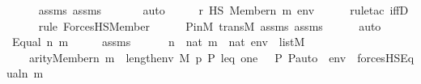 \begin{isabellebody}
\ \ \ \ \isamarkupfalse%
\ assms\ assms{}\ \isanewline
\ \ \ \ \isamarkupfalse%
\ auto\isanewline
\ \ \isamarkupfalse%
\ \isamarkupfalse%
\ {\isachardoublequoteopen}r\ {\isasymtturnstile}HS\ {\isacharparenleft}{\kern0pt}Member{\isacharparenleft}{\kern0pt}n{\isacharcomma}{\kern0pt}\ m{\isacharparenright}{\kern0pt}{\isacharparenright}{\kern0pt}\ env{\isachardoublequoteclose}\ \isanewline
\ \ \ \ \isamarkupfalse%
{\isacharparenleft}{\kern0pt}rule{\isacharunderscore}{\kern0pt}tac\ iffD{}{\isacharparenright}{\kern0pt}\isanewline
\ \ \ \ \ \isamarkupfalse%
{\isacharparenleft}{\kern0pt}rule\ ForcesHS{\isacharunderscore}{\kern0pt}Member{\isacharparenright}{\kern0pt}\isanewline
\ \ \ \ \isamarkupfalse%
\ P{\isacharunderscore}{\kern0pt}in{\isacharunderscore}{\kern0pt}M\ transM\ assms\ assms{}\isanewline
\ \ \ \ \isamarkupfalse%
\ auto\isanewline
{}\isamarkupfalse%
\isanewline
\ \ \isamarkupfalse%
\ {\isacharparenleft}{\kern0pt}Equal\ n\ m{\isacharparenright}{\kern0pt}\isanewline
\ \ \isamarkupfalse%
\ \isamarkupfalse%
\ assms{}\ {\isacharcolon}{\kern0pt}\ \isanewline
\ \ \ \ {\isachardoublequoteopen}n\ {\isasymin}\ nat{\isachardoublequoteclose}\ {\isachardoublequoteopen}m\ {\isasymin}\ nat{\isachardoublequoteclose}\ {\isachardoublequoteopen}env\ {\isasymin}\ list{\isacharparenleft}{\kern0pt}M{\isacharparenright}{\kern0pt}{\isachardoublequoteclose}\isanewline
\ \ \ \ {\isachardoublequoteopen}arity{\isacharparenleft}{\kern0pt}Member{\isacharparenleft}{\kern0pt}n{\isacharcomma}{\kern0pt}\ m{\isacharparenright}{\kern0pt}{\isacharparenright}{\kern0pt}\ {\isasymle}\ length{\isacharparenleft}{\kern0pt}env{\isacharparenright}{\kern0pt}{\isachardoublequoteclose}\ {\isachardoublequoteopen}M{\isacharcomma}{\kern0pt}\ {\isacharbrackleft}{\kern0pt}p{\isacharcomma}{\kern0pt}\ P{\isacharcomma}{\kern0pt}\ leq{\isacharcomma}{\kern0pt}\ one{\isacharcomma}{\kern0pt}\ {\isasymlangle}{\isasymF}{\isacharcomma}{\kern0pt}\ {\isasymG}{\isacharcomma}{\kern0pt}\ P{\isacharcomma}{\kern0pt}\ P{\isacharunderscore}{\kern0pt}auto{\isasymrangle}{\isacharbrackright}{\kern0pt}\ {\isacharat}{\kern0pt}\ env\ {\isasymTurnstile}\ forcesHS{\isacharparenleft}{\kern0pt}Equal{\isacharparenleft}{\kern0pt}n{\isacharcomma}{\kern0pt}\ m{\isacharparenright}{\kern0pt}{\isacharparenright}{\kern0pt}{\isachardoublequoteclose}\ \isanewline
\ \ \ \ \isamarkupfalse%

\end{isabellebody}
